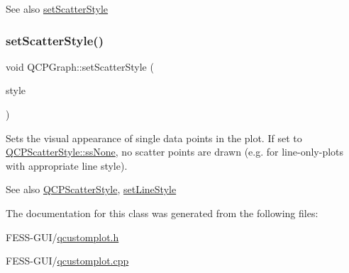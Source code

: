 \begin{DoxySeeAlso}{See also}
\hyperlink{class_q_c_p_graph_a12bd17a8ba21983163ec5d8f42a9fea5}{set\+Scatter\+Style} 
\end{DoxySeeAlso}
\hypertarget{class_q_c_p_graph_a12bd17a8ba21983163ec5d8f42a9fea5}{}\label{class_q_c_p_graph_a12bd17a8ba21983163ec5d8f42a9fea5} 
\subsubsection{\texorpdfstring{set\+Scatter\+Style()}{setScatterStyle()}}
{\footnotesize\ttfamily void Q\+C\+P\+Graph\+::set\+Scatter\+Style (\begin{DoxyParamCaption}\item[{const \hyperlink{class_q_c_p_scatter_style}{Q\+C\+P\+Scatter\+Style} \&}]{style }\end{DoxyParamCaption})}

Sets the visual appearance of single data points in the plot. If set to \hyperlink{class_q_c_p_scatter_style_adb31525af6b680e6f1b7472e43859349abd144c291ca274f77053ec68cab6c022}{Q\+C\+P\+Scatter\+Style\+::ss\+None}, no scatter points are drawn (e.\+g. for line-\/only-\/plots with appropriate line style).

\begin{DoxySeeAlso}{See also}
\hyperlink{class_q_c_p_scatter_style}{Q\+C\+P\+Scatter\+Style}, \hyperlink{class_q_c_p_graph_a513fecccff5b2a50ce53f665338c60ff}{set\+Line\+Style} 
\end{DoxySeeAlso}


The documentation for this class was generated from the following files\+:\begin{DoxyCompactItemize}
\item 
F\+E\+S\+S-\/\+G\+U\+I/\hyperlink{qcustomplot_8h}{qcustomplot.\+h}\item 
F\+E\+S\+S-\/\+G\+U\+I/\hyperlink{qcustomplot_8cpp}{qcustomplot.\+cpp}\end{DoxyCompactItemize}
